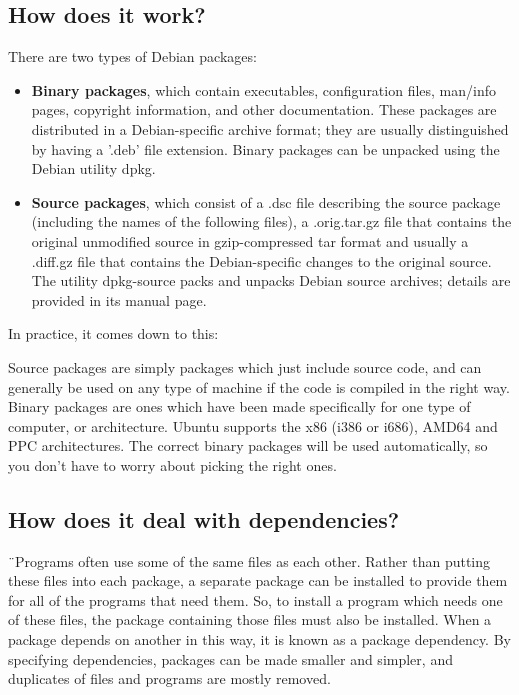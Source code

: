 \documentclass[10pt,a4paper]{article}
\begin{document}
\subsection{How does it work?}
There are two types of Debian packages:
 
\begin{itemize}
\item
\textbf{Binary packages}, which contain executables, configuration files, man/info pages, copyright information, and other documentation. These packages are distributed in a Debian-specific archive format; they are usually distinguished by having a '.deb' file extension. Binary packages can be unpacked using the Debian utility dpkg\cite{patref2}.
\item
\textbf{Source packages}, which consist of a .dsc file describing the source package (including the names of the following files), a .orig.tar.gz file that contains the original unmodified source in gzip-compressed tar format and usually a .diff.gz file that contains the Debian-specific changes to the original source. The utility dpkg-source packs and unpacks Debian source archives; details are provided in its manual page\cite{patref2}.
\end{itemize}
 
In practice, it comes down to this:
 
Source packages are simply packages which just include source code, and can generally be used on any type of machine if the code is compiled in the right way.
\\
Binary packages are ones which have been made specifically for one type of computer, or architecture. Ubuntu supports the x86 (i386 or i686), AMD64 and PPC architectures. The correct binary packages will be used automatically, so you don't have to worry about picking the right ones\cite{patref3}.
 
\subsection{How does it deal with dependencies?}
¨Programs often use some of the same files as each other. Rather than putting these files into each package, a separate package can be installed to provide them for all of the programs that need them. So, to install a program which needs one of these files, the package containing those files must also be installed. When a package depends on another in this way, it is known as a package dependency. By specifying dependencies, packages can be made smaller and simpler, and duplicates of files and programs are mostly removed.
 
\end{document}
